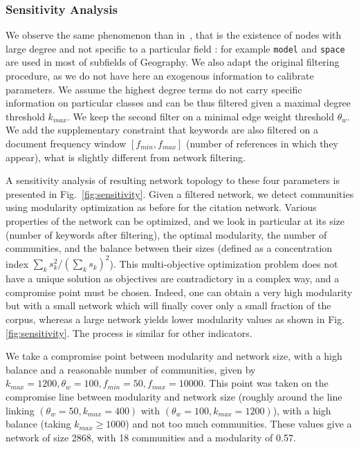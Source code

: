 \documentclass[10pt]{article}
\begin{document}
\subsubsection*{Sensitivity Analysis}

We observe the same phenomenon than in~\cite{bergeaud2017classifying}, that is the existence of nodes with large degree and not specific to a particular field : for example \texttt{model} and \texttt{space} are used in most of subfields of Geography. We also adapt the original filtering procedure, as we do not have here an exogenous information to calibrate parameters. We assume the highest degree terms do not carry specific information on particular classes and can be thus filtered given a maximal degree threshold $k_{max}$. We keep the second filter on a minimal edge weight threshold $\theta_w$. We add the supplementary constraint that keywords are also filtered on a document frequency window $\left[ f_{min},f_{max} \right]$ (number of references in which they appear), what is slightly different from network filtering.

A sensitivity analysis of resulting network topology to these four parameters is presented in Fig.~\ref{fig:sensitivity}. Given a filtered network, we detect communities using modularity optimization as before for the citation network. Various properties of the network can be optimized, and we look in particular at its size (number of keywords after filtering), the optimal modularity, the number of communities, and the balance between their sizes (defined as a concentration index $\sum_k s_k^2 / (\sum_k s_k)^2$). This multi-objective optimization problem does not have a unique solution as objectives are contradictory in a complex way, and a compromise point must be chosen. Indeed, one can obtain a very high modularity but with a small network which will finally cover only a small fraction of the corpus, whereas a large network yields lower modularity values as shown in Fig.\ref{fig:sensitivity}. The process is similar for other indicators.

We take a compromise point between modularity and network size, with a high balance and a reasonable number of communities, given by $k_{max} = 1200, \theta_w = 100, f_{min} = 50, f_{max} = 10000$. This point was taken on the compromise line between modularity and network size (roughly around the line linking $(\theta_w=50,k_{max}=400)$ with $(\theta_w=100,k_{max}=1200)$), with a high balance (taking $k_{max}\geq 1000$) and not too much communities. These values give a network of size 2868, with 18 communities and a modularity of 0.57.
\end{document}
